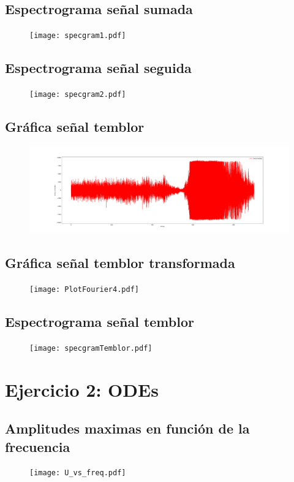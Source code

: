 \documentclass[11pt,letterpaper]{exam}
\begin{document}
\subsection{Espectrograma señal sumada}
\begin{figure}[H]
\centering
\texttt{[image: specgram1.pdf]}
\end{figure}

\subsection{Espectrograma señal seguida}
\begin{figure}[H]
\centering
\texttt{[image: specgram2.pdf]}
\end{figure}

\subsection{Gráfica señal temblor}
\begin{figure}[H]
\centering
\includegraphics[scale=0.25]{PlotFourier3.pdf}
\end{figure}

\subsection{Gráfica señal temblor transformada}
\begin{figure}[H]
\centering
\texttt{[image: PlotFourier4.pdf]}
\end{figure}

\subsection{Espectrograma señal temblor}
\begin{figure}[H]
\centering
\texttt{[image: specgramTemblor.pdf]}
\end{figure}

\section{Ejercicio 2: ODEs}
\subsection{Amplitudes maximas en función de la frecuencia}
\begin{figure}[H]
\centering
\texttt{[image: U\_vs\_freq.pdf]}
\end{figure}
\end{document}
